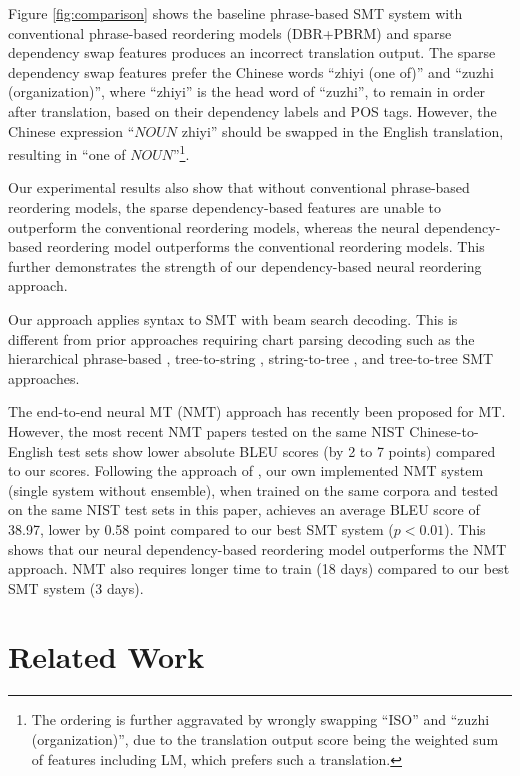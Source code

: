 \documentclass[letterpaper]{article}
\begin{document}
Figure \ref{fig:comparison} shows the baseline phrase-based SMT system with conventional phrase-based reordering models (DBR+PBRM) and sparse dependency swap features produces an incorrect translation output. The sparse dependency swap features prefer the Chinese words ``zhiyi (one of)'' and ``zuzhi (organization)'', where ``zhiyi'' is the head word of ``zuzhi'', to remain in order after translation, based on their dependency labels and POS tags. However, the Chinese expression ``$NOUN$ zhiyi'' should be swapped in the English translation, resulting in ``one of $NOUN$''\footnote{The ordering is further aggravated by wrongly swapping ``ISO'' and ``zuzhi (organization)'', due to the translation output score being the weighted sum of features including LM, which prefers such a translation.}.

Our experimental results also show that without conventional phrase-based reordering models, the sparse dependency-based features are unable to outperform the conventional reordering models, whereas the neural dependency-based reordering model outperforms the conventional reordering models. This further demonstrates the strength of our dependency-based neural reordering approach.

Our approach applies syntax to SMT with beam search decoding. This is different from prior approaches requiring chart parsing decoding such as the hierarchical phrase-based \cite{chiang_hierarchical_2007}, tree-to-string \cite{liu_tree--string_2006}, string-to-tree \cite{marcu_spmt:_2006}, and tree-to-tree \cite{zhai_simple_2011} SMT approaches.

The end-to-end neural MT (NMT) approach has recently been proposed for MT. However, the most recent NMT papers tested on the same NIST Chinese-to-English test sets \cite{wang_memory-enhanced_2016,zhang_variational_2016} show lower absolute BLEU scores (by 2 to 7 points) compared to our scores. Following the approach of \cite{junczys-dowmunt_is_2016}, our own implemented NMT system (single system without ensemble), when trained on the same corpora and tested on the same NIST test sets in this paper, achieves an average BLEU score of 38.97, lower by 0.58 point compared to our best SMT system ($p<0.01$). This shows that our neural dependency-based reordering model outperforms the NMT approach. NMT also requires longer time to train (18 days) compared to our best SMT system (3 days).

\section{Related Work}
\end{document}
